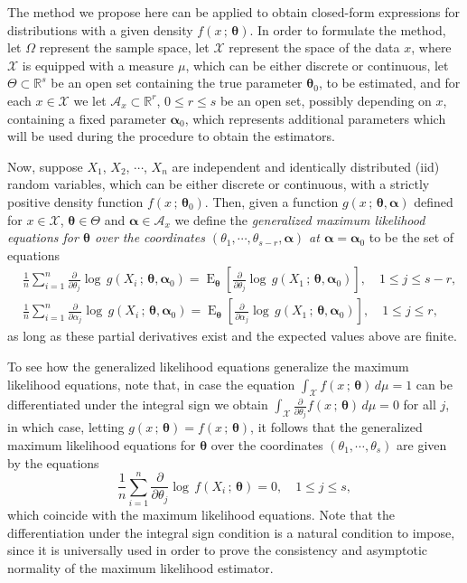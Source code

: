 \documentclass[10pt,a4paper,onecolumn]{article} %
\newcommand{\bs}{\boldsymbol}
\newcommand{\on}{\operatorname}
\begin{document}
The method we propose here can be applied to obtain closed-form expressions for distributions with a given density $f(x\,;\,\bs\theta)$. In order to formulate the method, let $\Omega$ represent the sample space, let $\mathcal{X}$ represent the space of the data $x$, where $\mathcal{X}$ is equipped with a measure $\mu$, which can be either discrete or continuous, let $\Theta\subset \mathbb{R}^{s}$ be an open set containing the true parameter $\bs{\theta}_0$, to be estimated, and for each $x\in \mathcal{X}$ we let $\mathcal{A}_x\subset \mathbb{R}^{r}$, $0\leq r\leq s$ be an open set, possibly depending on $x$, containing  a fixed parameter $\bs{\alpha}_0$, which represents additional parameters which will be used during the procedure to obtain the estimators.

Now, suppose $X_1$, $X_2$, $\cdots$, $X_n$ are independent and identically distributed (iid) random variables, which can be either discrete or continuous, with a strictly positive density function  $f(x\,;\,\bs{\theta}_0)$. Then, given a function $g(x\,;\,\bs{\theta},\bs{\alpha})$ defined for $x\in \mathcal{X}$, $\bs{\theta}\in \Theta$ and $\bs{\alpha}\in \mathcal{A}_x$ we define the \textit{generalized maximum likelihood equations for $\bs{\theta}$ over the coordinates $(\theta_1,\cdots,\theta_{s-r},\bs{\alpha})$ at $\bs{\alpha}=\bs{\alpha}_0$} to be the set of equations
\begin{equation}\label{modified}
\begin{aligned}
&\frac{1}{n}\sum_{i=1}^n \frac{\partial}{\partial \theta_j}  \log\, g(X_i\,;\,\bs{\theta},\bs{\alpha}_0) = \on{E}_{\bs{\theta}}\left[\frac{\partial}{\partial \theta_j}  \log\, g(X_1\,;\,\bs{\theta},\bs{\alpha}_0)\right],\quad 1\leq j\leq s-r,\\ &\frac{1}{n}
\sum_{i=1}^n \frac{\partial}{\partial \alpha_j}  \log\, g(X_i\,;\,\bs{\theta},\bs{\alpha}_0)=\on{E}_{\bs{\theta}}\left[\frac{\partial}{\partial \alpha_j}  \log\, g(X_1\,;\,\bs{\theta},\bs{\alpha}_0)\right], \quad  1\leq j\leq r,
\end{aligned}
\end{equation}
as long as these partial derivatives exist and the expected values above are finite.

To see how the generalized likelihood equations generalize the maximum likelihood equations, note that, in case the equation $\int_{\mathcal{X}} f(x\,;\,\bs{\theta})\, d\mu =1$ can be differentiated under the integral sign we obtain $\int_{\mathcal{X}} \frac{\partial}{\partial \theta_j} f(x\,;\,\bs{\theta})\, d\mu =0$ for all $j$, in which case, letting $g(x\,;\,\bs{\theta})=f(x\,;\,\bs{\theta})$, it follows that the generalized maximum likelihood equations for $\bs{\theta}$ over the coordinates $(\theta_1,\cdots,\theta_s)$ are given by the equations
\begin{equation*}
\frac{1}{n}\sum_{i=1}^n \frac{\partial}{\partial \theta_j}  \log\, f(X_i\,;\,\bs{\theta}) = 0,\quad 1\leq j\leq s,
\end{equation*}
which coincide with the maximum likelihood equations. Note that the differentiation under the integral sign condition is a natural condition to impose, since it is universally used in order to prove the consistency and asymptotic normality of the maximum likelihood estimator.
\end{document}
